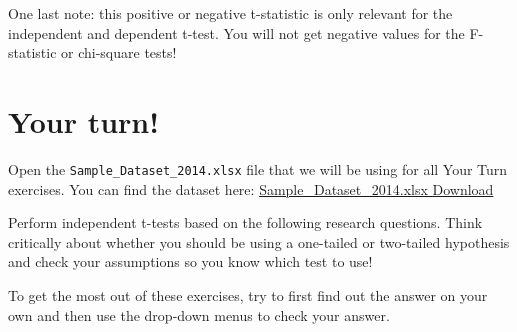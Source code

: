 \documentclass[
]{book}
\begin{document}
One last note: this positive or negative t-statistic is only relevant for the independent and dependent t-test. You will not get negative values for the F-statistic or chi-square tests!

\hypertarget{your-turn}{%
\section{Your turn!}\label{your-turn}}

Open the \texttt{Sample\_Dataset\_2014.xlsx} file that we will be using for all Your Turn exercises. You can find the dataset here: \href{https://github.com/danawanzer/stats-with-jamovi/blob/master/data/Sample_Dataset_2014.xlsx}{Sample\_Dataset\_2014.xlsx Download}

Perform independent t-tests based on the following research questions. Think critically about whether you should be using a one-tailed or two-tailed hypothesis and check your assumptions so you know which test to use!

To get the most out of these exercises, try to first find out the answer on your own and then use the drop-down menus to check your answer.
\end{document}
